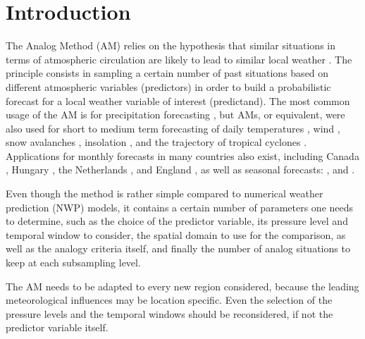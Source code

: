\documentclass{ametsoc}
\begin{document}


\section{Introduction}
\label{section_intro}

The Analog Method (AM) relies on the hypothesis that similar situations in terms of atmospheric circulation are likely to lead to similar local weather \citep{Lorenz1956, Lorenz1969, Duband1970, Bontron2005}. The principle consists in sampling a certain number of past situations based on different atmospheric variables (predictors) in order to build a probabilistic forecast for a local weather variable of interest (predictand). The most common usage of the AM is for precipitation forecasting \citep[eg.][]{Guilbaud1997, Bontron2005, Bliefernicht2010, Marty2012, Horton2012, Radanovics2013, BenDaoud2015}, but AMs, or equivalent, were also used for short to medium term forecasting of daily temperatures \citep{Radinovic1975, Woodcock1980, Kruizinga1983}, wind \citep{Gordon1987}, snow avalanches \citep{Obled1980, Bolognesi1993}, insolation \citep{Bois1981}, and the trajectory of tropical cyclones \citep{Keenan1981, Sievers2000, Fraedrich2003}. Applications for monthly forecasts in many countries also exist, including Canada \citep{Shabbar1986},  Hungary \citep{Toth1989}, the Netherlands \citep{Nap1981}, and England \citep{Murray1974}, as well as seasonal forecasts: \citet{Barnett1978}, \citet{Bergen1982} and \citet{Livezey1988}.

Even though the method is rather simple compared to numerical weather prediction (NWP) models, it contains a certain number of parameters one needs to determine, such as the choice of the predictor variable, its pressure level and temporal window to consider, the spatial domain to use for the comparison, as well as the analogy criteria itself, and finally the number of analog situations to keep at each subsampling level. 

The AM needs to be adapted to every new region considered, because the leading meteorological influences may be location specific. Even the selection of the pressure levels and the temporal windows should be reconsidered, if not the predictor variable itself. 
\end{document}
